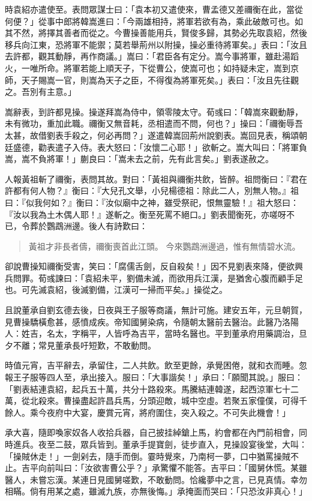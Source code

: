 時袁紹亦遣使至。表問眾謀士曰：「袁本初又遣使來，曹孟德又差禰衡在此，當從何便？」從事中郎將韓嵩進曰：「今兩雄相持，將軍若欲有為，乘此破敵可也。如其不然，將擇其善者而從之。今曹操善能用兵，賢俊多歸，其勢必先取袁紹，然後移兵向江東，恐將軍不能禦；莫若舉荊州以附操，操必重待將軍矣。」表曰：「汝且去許都，觀其動靜，再作商議。」嵩曰：「君臣各有定分。嵩今事將軍，雖赴湯蹈火，一唯所命。將軍若能上順天子，下從曹公，使嵩可也；如持疑未定，嵩到京師，天子賜嵩一官，則嵩為天子之臣，不得復為將軍死矣。」表曰：「汝且先往觀之。吾別有主意。」

嵩辭表，到許都見操。操遂拜嵩為侍中，領零陵太守。荀彧曰：「韓嵩來觀動靜，未有微功，重加此職。禰衡又無音耗，丞相遣而不問，何也？」操曰：「禰衡辱吾太甚，故借劉表手殺之，何必再問？」遂遣韓嵩回荊州說劉表。嵩回見表，稱頌朝廷盛德，勸表遣子入侍。表大怒曰：「汝懷二心耶！」欲斬之。嵩大叫曰：「將軍負嵩，嵩不負將軍！」蒯良曰：「嵩未去之前，先有此言矣。」劉表遂赦之。

人報黃祖斬了禰衡，表問其故。對曰：「黃祖與禰衡共飲，皆醉。祖問衡曰：『君在許都有何人物？』衡曰：『大兒孔文舉，小兒楊德祖：除此二人，別無人物。』祖曰：『似我何如？』衡曰：『汝似廟中之神，雖受祭祀，恨無靈驗！』祖大怒曰：『汝以我為土木偶人耶！』遂斬之。衡至死罵不絕口。」劉表聞衡死，亦嗟呀不已，令葬於鸚鵡洲邊。後人有詩歎曰：

\begin{quote}
黃祖才非長者儔，禰衡喪首此江頭。
今來鸚鵡洲邊過，惟有無情碧水流。
\end{quote}

卻說曹操知禰衡受害，笑曰：「腐儒舌劍，反自殺矣！」因不見劉表來降，便欲興兵問罪。荀彧諫曰：「袁紹未平，劉備未滅，而欲用兵江漢，是猶舍心腹而顧手足也。可先滅袁紹，後滅劉備，江漢可一掃而平矣。」操從之。

且說董承自劉玄德去後，日夜與王子服等商議，無計可施。建安五年，元旦朝賀，見曹操驕橫愈甚，感憤成疾。帝知國舅染病，令隨朝太醫前去醫治。此醫乃洛陽人：姓吉，名太，字稱平，人皆呼為吉平，當時名醫也。平到董承府用藥調治，旦夕不離；常見董承長吁短歎，不敢動問。

時值元宵，吉平辭去，承留住，二人共飲。飲至更餘，承覺困倦，就和衣而睡。忽報王子服等四人至，承出接入。服曰：「大事諧矣！」承曰：「願聞其說。」服曰：「劉表結連袁紹，起兵五十萬，共分十路殺來。馬騰結連韓遂，起西涼軍七十二萬，從北殺來。曹操盡起許昌兵馬，分頭迎敵，城中空虛。若聚五家僮僕，可得千餘人。乘今夜府中大宴，慶賞元宵，將府圍住，突入殺之。不可失此機會！」

承大喜，隨即喚家奴各人收拾兵器，自己披挂綽鎗上馬，約會都在內門前相會，同時進兵。夜至二鼓，眾兵皆到。董承手提寶劍，徒步直入，見操設宴後堂，大叫：「操賊休走！」一劍剁去，隨手而倒。霎時覺來，乃南柯一夢，口中猶罵操賊不止。吉平向前叫曰：「汝欲害曹公乎？」承驚懼不能答。吉平曰：「國舅休慌。某雖醫人，未嘗忘漢。某連日見國舅嗟歎，不敢動問。恰纔夢中之言，已見真情。幸勿相瞞。倘有用某之處，雖滅九族，亦無後悔。」承掩面而哭曰：「只恐汝非真心！」

